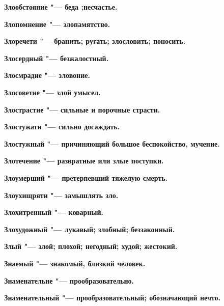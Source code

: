 \bfseries Злообстояние \normalfont{} "--- беда ;несчастье. 




\bfseries Злопомнение \normalfont{} "--- злопамятство. 




\bfseries Злоречети \normalfont{} "--- бранить; ругать; злословить; поносить. 




\bfseries Злосердный \normalfont{} "--- безжалостный. 




\bfseries Злосмрадие \normalfont{} "--- зловоние. 




\bfseries Злосоветие \normalfont{} "--- злой умысел. 




\bfseries Злострастие \normalfont{} "--- сильные и порочные страсти. 




\bfseries Злостужати \normalfont{} "--- сильно досаждать. 




\bfseries Злостужный \normalfont{} "--- причиняющий большое беспокойство, мучение. 




\bfseries Злотечение \normalfont{} "--- развратные или злые поступки. 




\bfseries Злоумерший \normalfont{} "--- претерпевший тяжелую смерть. 




\bfseries Злоухищряти \normalfont{} "--- замышлять зло. 




\bfseries Злохитренный \normalfont{} "--- коварный. 




\bfseries Злохудожный \normalfont{} "--- лукавый; злобный; беззаконный. 




\bfseries Злый \normalfont{} "--- злой; плохой; негодный; худой; жестокий. 




\bfseries Знаемый \normalfont{} "--- знакомый, близкий человек. 




\bfseries Знаменательне \normalfont{} "--- прообразовательно. 




\bfseries Знаменательный \normalfont{} "--- прообразовательный; обозначающий нечто. 




